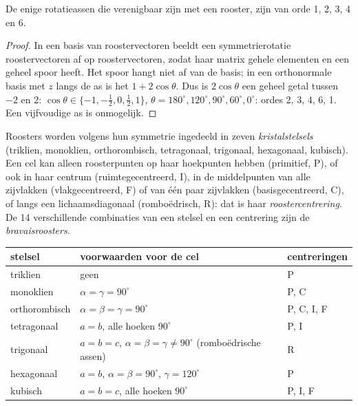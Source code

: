 \begin{theorem}\label{thm:b3:x-ray-diffraction:restriction}
De enige rotatieassen die verenigbaar zijn met een rooster, zijn van orde
1, 2, 3, 4 en 6.
\end{theorem}

\begin{proof}
In een basis van roostervectoren beeldt een symmetrierotatie roostervectoren
af op roostervectoren, zodat haar matrix gehele elementen en een geheel
spoor heeft. Het spoor hangt niet af van de basis; in een orthonormale
basis met $z$ langs de as is het $1 + 2\cos\theta$. Dus is $2\cos\theta$
een geheel getal tussen $-2$ en 2:
$\cos\theta \in \{-1, -\frac12, 0, \frac12, 1\}$, $\theta = 180^\circ, 120^\circ, 90^\circ,
60^\circ, 0^\circ$: ordes 2, 3, 4, 6, 1. Een vijfvoudige as is onmogelijk.
\end{proof}

\begin{definition}\label{def:b3:x-ray-diffraction:crystal-system}
Roosters worden volgens hun symmetrie ingedeeld in zeven
\emph{kristalstelsels} (triklien, monoklien,
orthorombisch, tetragonaal, trigonaal, hexagonaal, kubisch). Een cel kan
alleen roosterpunten op haar hoekpunten hebben (primitief, P), of ook in
haar centrum (ruimtegecentreerd, I), in de middelpunten van alle zijvlakken
(vlakgecentreerd, F) of van één paar zijvlakken (basisgecentreerd, C), of
langs een lichaamsdiagonaal (romboëdrisch, R): dat is haar
\emph{roostercentrering}. De 14 verschillende
combinaties van een stelsel en een centrering zijn de
\emph{bravaisroosters}.
\end{definition}

\begin{center}\small
\begin{tabular}{lll}
\hline
stelsel & voorwaarden voor de cel & centreringen \\ \hline
triklien & geen & P \\
monoklien & $\alpha = \gamma = 90^\circ$ & P, C \\
orthorombisch & $\alpha = \beta = \gamma = 90^\circ$ & P, C, I, F \\
tetragonaal & $a = b$, alle hoeken $90^\circ$ & P, I \\
trigonaal & $a = b = c$, $\alpha = \beta = \gamma \ne 90^\circ$ (romboëdrische assen) & R \\
hexagonaal & $a = b$, $\alpha = \beta = 90^\circ$, $\gamma = 120^\circ$ & P \\
kubisch & $a = b = c$, alle hoeken $90^\circ$ & P, I, F \\ \hline
\end{tabular}
\end{center}


